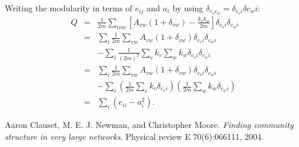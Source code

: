 \documentclass{article}
\newcommand{\beq}{\begin{eqnarray}}
\newcommand{\eeq}{\end{eqnarray}}
\begin{document}
Writing the modularity in terms of $e_{ij}$ and $a_i$ by using
$\delta_{c_vc_w} = \delta_{c_vi}\delta{c_wi}$:
\beq
Q &=& \frac{1}{2m} \sum_{ivw} \left[ A_{vw} (1 + \delta_{vw}) - \frac{k_v k_w}{2m} \right]\delta_{c_v i}\delta_{c_w i} \\
&=& \sum_i 
\frac{1}{2m} \sum_{vw} A_{vw} (1 + \delta_{vw}) \delta_{c_v i}\delta_{c_w i}  \nonumber \\
&& - \sum_i  \frac{1}{(2m)^2} \sum_{v} k_v \sum_w k_w \delta_{c_v i}\delta_{c_w i}  \\
&=& \sum_i 
\frac{1}{2m} \sum_{vw} A_{vw} (1 + \delta_{vw}) \delta_{c_v i}\delta_{c_w i}  \nonumber \\
&& - \sum_i  \left( \frac{1}{2m} \sum_{v} k_v \delta_{c_v i} \right) \left(\frac{1}{2m}\sum_w k_w \delta_{c_w i} \right) \\
&=& \sum_i \left( e_{ii} - a_i^2 \right).
\eeq

\begin{thebibliography}{1}
Aaron Clauset, M. E. J. Newman, and Christopher Moore.
\textit{Finding community structure in very large networks}. 
Physical review E 70(6):066111, 2004.
\end{thebibliography}
\end{document}
